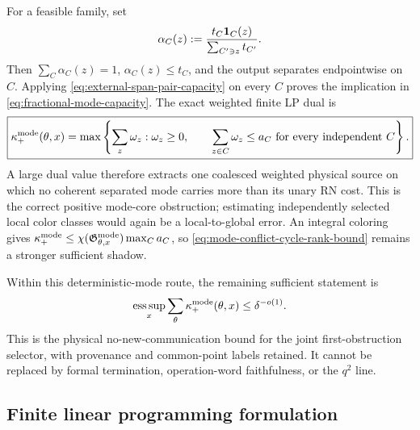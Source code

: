 \documentclass[11pt]{article}
\begin{document}
For a feasible family, set
\[
 \alpha_C(z)
 :=
 \frac{t_C{\bf1}_{C}(z)}
      {\sum_{C'\ni z}t_{C'}}.
\]
Then \(\sum_C\alpha_C(z)=1\), \(\alpha_C(z)\le t_C\), and the output separates
endpointwise on \(C\).  Applying
\eqref{eq:external-span-pair-capacity} on every \(C\) proves the implication
in \eqref{eq:fractional-mode-capacity}.
The exact weighted finite LP dual is
\begin{equation}\label{eq:mode-conflict-fractional-dual}
 \boxed{
\kappa_{+}^{\rm mode}(\theta,x)
 =
 \max\left\{
  \sum_z\omega_z:
  \omega_z\ge0,\qquad
  \sum_{z\in C}\omega_z\le a_C
  \text{ for every independent }C
 \right\}.}
\end{equation}
A large dual value therefore extracts one coalesced weighted physical source
on which no coherent separated mode carries more than its unary RN cost.  This is the
correct positive mode-core obstruction; estimating independently selected
local color classes would again be a local-to-global error.  An integral
coloring gives
\(\kappa_+^{\rm mode}\le
\chi(\mathfrak G_{\theta,x}^{\rm mode})\max_Ca_C\), so
\eqref{eq:mode-conflict-cycle-rank-bound} remains a stronger sufficient
shadow.

Within this deterministic-mode route, the remaining sufficient statement is
\[
 \operatorname*{ess\,sup}_x
 \sum_\theta\kappa_{+}^{\rm mode}(\theta,x)
 \le\delta^{-o(1)}.
\]
This is the physical no-new-communication bound for the joint
first-obstruction selector, with provenance and common-point labels retained.
It cannot be replaced by formal termination, operation-word faithfulness, or
the \(q^2\) line.

\subsection{Finite linear programming formulation}
\end{document}
